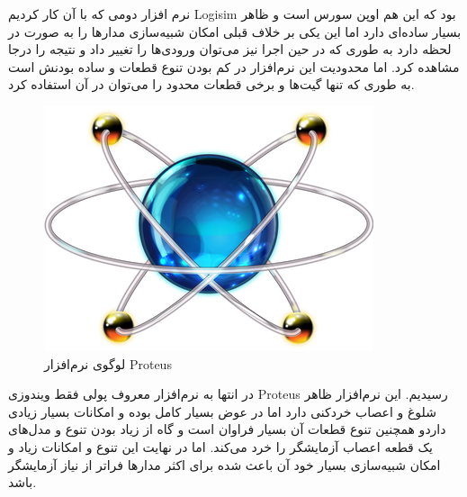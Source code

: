 نرم افزار دومی که با آن کار کردیم
Logisim
بود که این هم اوپن سورس است و ظاهر بسیار ساده‌ای دارد اما این یکی بر خلاف قبلی امکان شبیه‌سازی مدارها را به صورت در لحظه دارد به طوری که در حین اجرا نیز می‌توان ورودی‌ها را تغییر داد و نتیجه را درجا مشاهده کرد.
اما محدودیت این نرم‌افزار در کم بودن تنوع قطعات و ساده بودنش است به طوری که تنها گیت‌ها و برخی قطعات محدود را می‌توان در آن استفاده کرد.

\begin{figure}[h!]
\centering
\includegraphics[scale=0.3]{conclusion/proteus.png}
\caption{
لوگوی نرم‌افزار
Proteus}
\end{figure}

در انتها به نرم‌افزار
معروف
پولی فقط ویندوزی
Proteus
رسیدیم.
این نرم‌افزار ظاهر شلوغ و اعصاب خردکنی دارد اما در عوض بسیار کامل بوده و امکانات بسیار زیادی داردو همچنین تنوع قطعات آن بسیار فراوان است و گاه از زیاد بودن تنوع و مدل‌های یک قطعه اعصاب آزمایشگر را خرد می‌کند. 
اما در نهایت این تنوع و امکانات زیاد و امکان شبیه‌سازی بسیار خود آن باعث شده برای اکثر مدارها فراتر از نیاز آزمایشگر باشد.